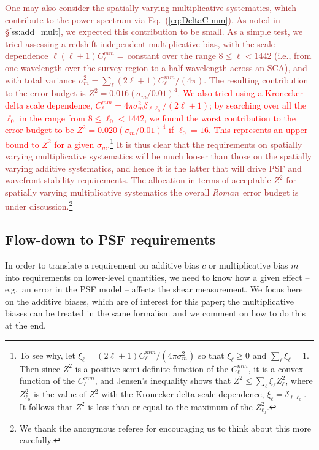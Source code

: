 \documentclass[usenatbib]{mnras}
\newcommand{\wfirst}{{\slshape Roman}}
\newcommand{\changetext}[1]{\textcolor{brown}{#1}}
\newcommand{\changetexttwo}[1]{\textcolor{red}{#1}}
\begin{document}
\changetext{One may also consider the spatially varying multiplicative systematics, which contribute to the power spectrum via Eq.~(\ref{eq:DeltaC-mm}). As noted in \S\ref{ss:add_mult}, we expected this contribution to be small. As a simple test, we tried assessing a redshift-independent multiplicative bias, with the scale dependence $\ell(\ell+1)C_\ell^{mm}= $\,constant over the range $8\le \ell < 1442$ (i.e., from one wavelength over the survey region to a half-wavelength across an SCA), and with total variance $\sigma^2_m = \sum_\ell (2\ell+1)C_\ell^{mm}/(4\pi)$. The resulting contribution to the error budget is $Z^2 = 0.016(\sigma_m/0.01)^4$. \changetexttwo{We also tried using a Kronecker delta scale dependence, $C_\ell^{mm} = 4\pi \sigma_m^2 \delta_{\ell\ell_0}/(2\ell+1)$; by searching over all the $\ell_0$ in the range from $8\le \ell_0<1442$, we found the worst contribution to the error budget to be $Z^2 = 0.020(\sigma_m/0.01)^4$ if $\ell_0=16$. This represents an upper bound to $Z^2$ for a given $\sigma_m$.\footnote{To see why, let $\xi_\ell = (2\ell+1)C_\ell^{mm}/(4\pi\sigma_m^2)$ so that $\xi_\ell\ge 0$ and $\sum_\ell \xi_\ell = 1$. Then since $Z^2$ is a positive semi-definite function of the $C_\ell^{mm}$, it is a convex function of the $C_\ell^{mm}$, and Jensen's inequality \citep[\S3.1.8]{boyd2004} shows that $Z^2 \le \sum_\ell \xi_\ell Z^2_\ell$, where $Z^2_{\ell_0}$ is the value of $Z^2$ with the Kronecker delta scale dependence, $\xi_\ell = \delta_{\ell\ell_0}$. It follows that $Z^2$ is less than or equal to the maximum of the $Z^2_{\ell_0}$.}} It is thus clear that the requirements on spatially varying multiplicative systematics will be much looser than those on the spatially varying additive systematics, and hence it is the latter that will drive PSF and wavefront stability requirements. The allocation in terms of acceptable $Z^2$ for spatially varying multiplicative systematics the overall \wfirst\ error budget is under discussion.\footnote{We thank the anonymous referee for encouraging us to think about this more carefully.}}

\subsection{Flow-down to PSF requirements}

In order to translate a requirement on additive bias $c$ or multiplicative bias $m$ into requirements on lower-level quantities, we need to know how a given effect -- e.g.\ an error in the PSF model -- affects the shear measurement. We focus here on the additive biases, which are of interest for this paper; the multiplicative biases can be treated in the same formalism and we comment on how to do this at the end.
\end{document}
